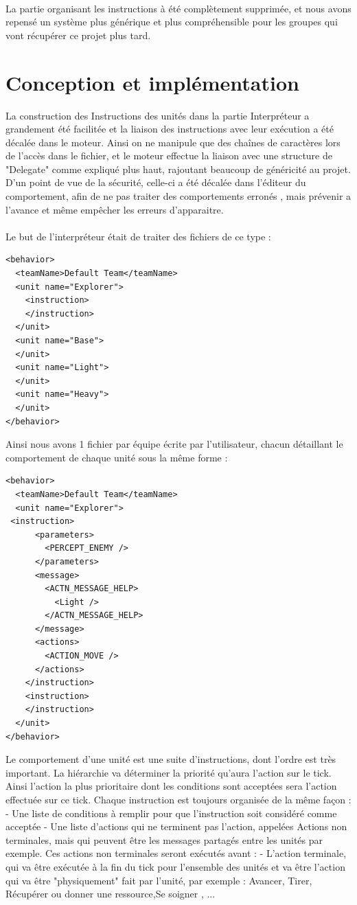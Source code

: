 \documentclass{report}
\begin{document}
\paragraph{}
\newpage
La partie organisant les instructions à été complètement supprimée, et nous avons repensé un système plus générique et plus compréhensible pour les groupes qui vont récupérer ce projet plus tard.
\section{Conception et implémentation}
La construction des Instructions des unités dans la partie Interpréteur a grandement été facilitée et la liaison des instructions avec leur exécution a été décalée dans le moteur. Ainsi on ne manipule que des chaînes de caractères lors de l'accès dans le fichier, et le moteur effectue la liaison avec une structure de "Delegate" comme expliqué plus haut, rajoutant beaucoup de généricité au projet.
D'un point de vue de la sécurité, celle-ci a été décalée dans l'éditeur du comportement, afin de ne pas traiter des comportements erronés , mais prévenir a l'avance et même empêcher les erreurs d'apparaitre.
\paragraph{}
Le but de l'interpréteur était de traiter des fichiers de ce type :
\begin{lstlisting}[frame=single]
<behavior>
  <teamName>Default Team</teamName>
  <unit name="Explorer">
    <instruction>
    </instruction>
  </unit>
  <unit name="Base">
  </unit>
  <unit name="Light">
  </unit>
  <unit name="Heavy">
  </unit>
</behavior>
\end{lstlisting}
Ainsi nous avons 1 fichier par équipe écrite par l'utilisateur, chacun détaillant le comportement de chaque unité sous la même forme :
\begin{lstlisting}[frame=single]
<behavior>
  <teamName>Default Team</teamName>
  <unit name="Explorer">
 <instruction>
      <parameters>
        <PERCEPT_ENEMY />
      </parameters>
      <message>
        <ACTN_MESSAGE_HELP>
          <Light />
        </ACTN_MESSAGE_HELP>
      </message>
      <actions>
        <ACTION_MOVE />
      </actions>
    </instruction>
    <instruction>
    </instruction>
  </unit>
</behavior>
\end{lstlisting}
Le comportement d'une unité est une suite d'instructions, dont l'ordre est très important. La hiérarchie va déterminer la priorité qu'aura l'action sur le tick. Ainsi l'action la plus prioritaire dont les conditions sont acceptées sera l'action effectuée sur ce tick.
Chaque instruction est toujours organisée de la même façon :
- Une liste de conditions à remplir pour que l'instruction soit considéré comme acceptée
- Une liste d'actions qui ne terminent pas l'action, appelées Actions non terminales, mais qui peuvent être les messages partagés entre les unités par exemple. Ces actions non terminales seront exécutés avant :
- L'action terminale, qui va être exécutée à la fin du tick pour l'ensemble des unités et va être l'action qui va être "physiquement" fait par l'unité, par exemple : Avancer, Tirer, Récupérer ou donner une ressource,Se soigner , ...
\end{document}
